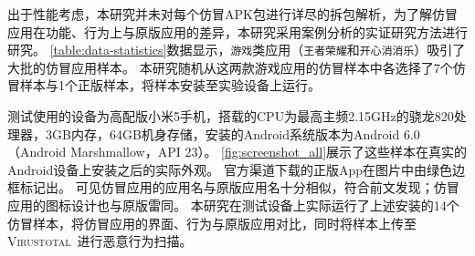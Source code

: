 出于性能考虑，本研究并未对每个仿冒APK包进行详尽的拆包解析，为了解仿冒应用在功能、行为上与原版应用的差异，本研究采用案例分析的实证研究方法进行研究。
\autoref{table:data-statistics}数据显示，\texttt{游戏}类应用（\texttt{王者荣耀}和\texttt{开心消消乐}）吸引了大批的仿冒应用样本。
本研究随机从这两款游戏应用的仿冒样本中各选择了7个仿冒样本与1个正版样本，将样本安装至实验设备上运行。

测试使用的设备为高配版小米5手机，搭载的CPU为最高主频2.15GHz的骁龙820处理器，3GB内存，64GB机身存储，安装的Android系统版本为Android 6.0（Android Marshmallow，API 23）。
\autoref{fig:screenshot_all}展示了这些样本在真实的Android设备上安装之后的实际外观。
官方渠道下载的正版App在图片中由绿色边框标记出。
可见仿冒应用的应用名与原版应用名十分相似，符合前文发现；仿冒应用的图标设计也与原版雷同。
本研究在测试设备上实际运行了上述安装的14个仿冒样本，将仿冒应用的界面、行为与原版应用对比，同时将样本上传至\textsc{Virustotal}~\cite{virustotal}进行恶意行为扫描。

